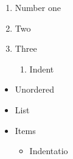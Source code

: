 \documentclass{article}
\begin{document}
	\begin{enumerate}


		\item Number one



		\item Two



		\item Three

		\begin{enumerate}


			\item Indent


		\end{enumerate}
	\end{enumerate}



	\begin{itemize}


		\item Unordered



		\item List



		\item Items

		\begin{itemize}


			\item Indentatio


		\end{itemize}
	\end{itemize}
\end{document}
